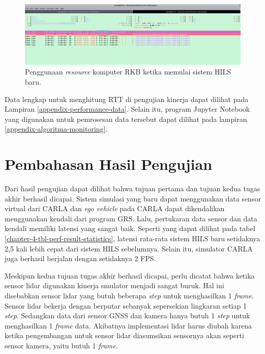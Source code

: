 \begin{figure}[!htbp]
	\centering
	\includegraphics[width=1.0\textwidth,trim={0cm 0cm 0cm 2.5cm},clip]{resources/chapter-4/resource-usage-new-hils-rkb.png}
	\caption{Penggunaan \textit{resource} komputer RKB ketika memulai sistem HILS baru.}
	\label{chapter-4-fig-perf-result-resource-usage-rkb-startup}
\end{figure}

Data lengkap untuk menghitung RTT di pengujian kinerja dapat dilihat pada
Lampiran \ref{appendix-performance-data}. Selain itu, program Jupyter Notebook
yang digunakan untuk pemrosesan data tersebut dapat dilihat pada lampiran
\ref{appendix-algoritma-monitoring}.

\section{Pembahasan Hasil Pengujian}

Dari hasil pengujian dapat dilihat bahwa tujuan pertama dan tujuan kedua tugas
akhir berhasil dicapai. Sistem simulasi yang baru dapat menggunakan data sensor
virtual dari CARLA dan \textit{ego vehicle} pada CARLA dapat dikendalikan
menggunakan kendali dari program GRS. Lalu, pertukaran data sensor dan data
kendali memiliki latensi yang sangat baik. Seperti yang dapat dilihat pada tabel
\ref{chapter-4-tbl-perf-result-statistics}, latensi rata-rata sistem HILS baru
setidaknya 2,5 kali lebih cepat dari sistem HILS sebelumnya. Selain itu,
simulator CARLA juga berhasil berjalan dengan setidaknya 2 FPS.

Meskipun kedua tujuan tugas akhir berhasil dicapai, perlu dicatat bahwa ketika
sensor lidar digunakan kinerja smulator menjadi sangat buruk. Hal ini disebabkan
sensor lidar yang butuh beberapa \textit{step} untuk menghasilkan 1
\textit{frame}. Sensor lidar bekerja dengan berputar sebanyak sepersekian
lingkaran setiap 1 \textit{step}. Sedangkan data dari sensor GNSS dan kamera
hanya butuh 1 \textit{step} untuk menghasilkan 1 \textit{frame} data. Akibatnya
implementasi lidar harus diubah karena ketika pengembangan untuk sensor lidar
diasumsikan sensornya akan seperti sensor kamera, yaitu butuh 1 \textit{frame}.

